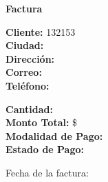 \documentclass{article}
\begin{document}
\begin{center}
    {\LARGE \textbf{Factura}}\\[1cm]
\end{center}

\textbf{Cliente:} 132153 \\
\textbf{Ciudad:}  \\
\textbf{Dirección:}  \\
\textbf{Correo:}  \\
\textbf{Teléfono:}  \\

\vspace{0.5cm}

\textbf{Cantidad:}  \\
\textbf{Monto Total:} \$  \\
\textbf{Modalidad de Pago:}  \\
\textbf{Estado de Pago:}  \\

\vspace{1cm}

Fecha de la factura: 
\end{document}
